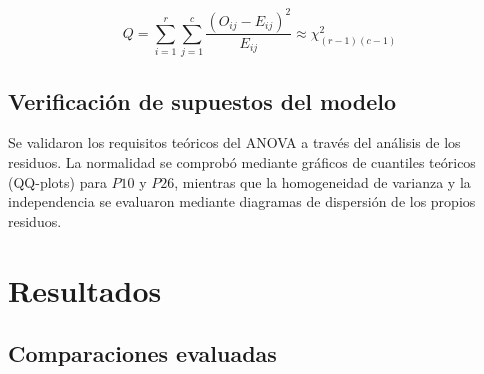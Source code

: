 \documentclass[
  spanish,
  11pt,
]{extarticle}
\begin{document}
\[Q = \sum_{i=1}^{r} \sum_{j=1}^{c} \frac{(O_{ij} - E_{ij})^2}{E_{ij}} \approx \chi^2_{(r-1)(c-1)}\]

\subsection{Verificación de supuestos del
modelo}\label{verificaciuxf3n-de-supuestos-del-modelo}

Se validaron los requisitos teóricos del ANOVA a través del análisis de
los residuos. La normalidad se comprobó mediante gráficos de cuantiles
teóricos (QQ-plots) para \(P10\) y \(P26\), mientras que la homogeneidad
de varianza y la independencia se evaluaron mediante diagramas de
dispersión de los propios residuos.

\section{Resultados}\label{resultados}

\subsection{Comparaciones evaluadas}\label{comparaciones-evaluadas}
\end{document}
